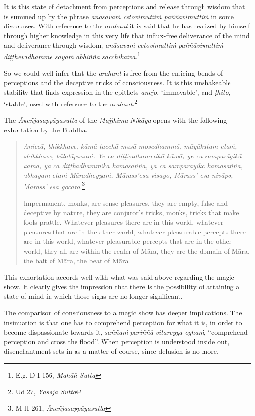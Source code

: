 It is this state of detachment from perceptions and release through wisdom that is summed up by the phrase \emph{anāsavaṁ cetovimuttiṁ paññāvimuttiṁ} in some discourses. With reference to the \emph{arahant} it is said that he has realized by himself through higher knowledge in this very life that influx-free deliverance of the mind and deliverance through wisdom, \emph{anāsavaṁ cetovimuttiṁ paññāvimuttiṁ diṭṭhevadhamme sayaṁ abhiññā sacchikatvā}.\footnote{E.g. D I 156, \emph{Mahāli Sutta}}

So we could well infer that the \emph{arahant} is free from the enticing bonds of perceptions and the deceptive tricks of consciousness. It is this unshakeable stability that finds expression in the epithets \emph{anejo}, `immovable', and \emph{ṭhito}, `stable', used with reference to the \emph{arahant}.\footnote{Ud 27, \emph{Yasoja Sutta}}

The \emph{Āneñjasappāyasutta} of the \emph{Majjhima Nikāya} opens with the following exhortation by the Buddha:

\begin{quote}
\emph{Aniccā, bhikkhave, kāmā tucchā musā mosadhammā, māyākatam etaṁ, bhikkhave, bālalāpanaṁ. Ye ca diṭṭhadhammikā kāmā, ye ca samparāyikā kāmā, yā ca diṭṭhadhammikā kāmasaññā, yā ca samparāyikā kāmasañña, ubhayam etaṁ Māradheyyaṁ, Mārass'esa visayo, Mārass' esa nivāpo, Mārass' esa gocaro.}\footnote{M II 261, \emph{Āneñjasappāyasutta}}

Impermanent, monks, are sense pleasures, they are empty, false and deceptive by nature, they are conjuror's tricks, monks, tricks that make fools prattle. Whatever pleasures there are in this world, whatever pleasures that are in the other world, whatever pleasurable percepts there are in this world, whatever pleasurable percepts that are in the other world, they all are within the realm of Māra, they are the domain of Māra, the bait of Māra, the beat of Māra.
\end{quote}

This exhortation accords well with what was said above regarding the magic show. It clearly gives the impression that there is the possibility of attaining a state of mind in which those signs are no longer significant.

The comparison of consciousness to a magic show has deeper implications. The insinuation is that one has to comprehend perception for what it is, in order to become dispassionate towards it, \emph{saññaṁ pariññā vitareyya oghaṁ}, ``comprehend perception and cross the flood''. When perception is understood inside out, disenchantment sets in as a matter of course, since delusion is no more.

